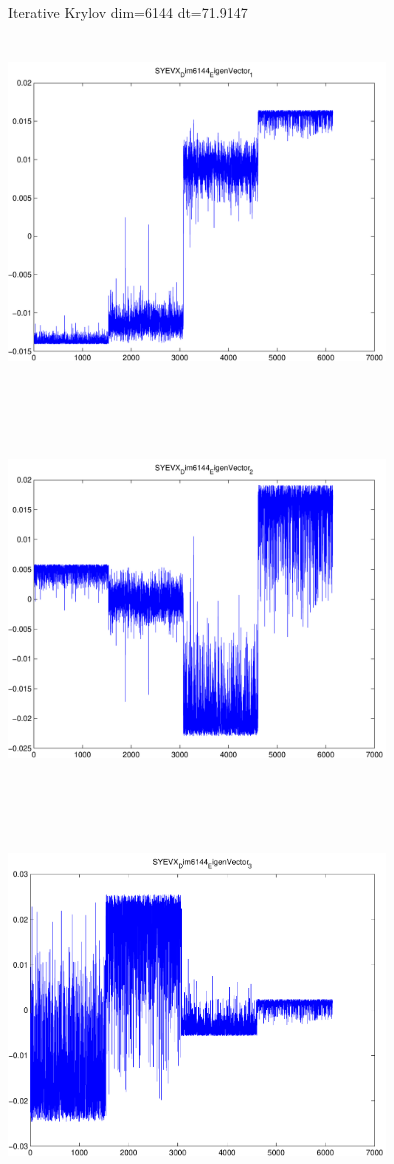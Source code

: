 \documentclass[9pt]{article}
\theoremstyle{plain}
\theoremstyle{definition}
\theoremstyle{remark}
\numberwithin{equation}{section}
\begin{document}
Iterative Krylov dim=6144 dt=71.9147
\includegraphics[width=10.0cm,height=10.0cm]{SYEVX_Dim6144_EigenVector_1.pdf}

\includegraphics[width=10.0cm,height=10.0cm]{SYEVX_Dim6144_EigenVector_2.pdf}

\includegraphics[width=10.0cm,height=10.0cm]{SYEVX_Dim6144_EigenVector_3.pdf}
\end{document}
